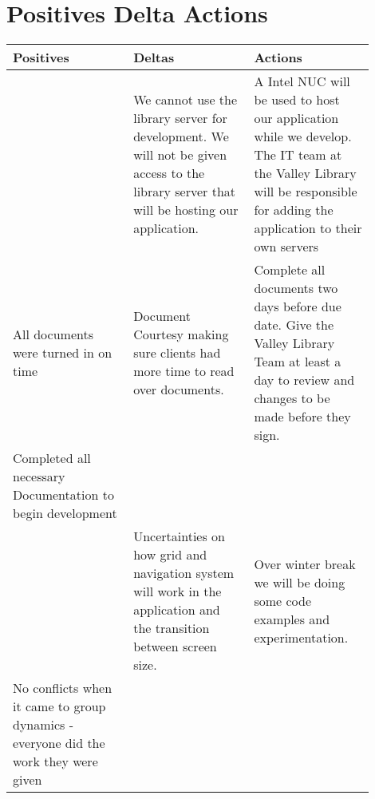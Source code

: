 \documentclass[letterpaper,10pt,titlepage, onecolumn, compsoc]{IEEEtran}
\begin{document}
\section{Positives \/Delta \/ Actions }
\begin{center}

\begin{tabular}{|p{0.3\linewidth}|p{0.3\linewidth}|p{0.3\linewidth}|}
\hline
\textbf{Positives}                                                                  & \textbf{Deltas}                                                                                                                           & \textbf{Actions}                                                                                                                                                         \\ \hline
                                                                                    & We cannot use the library server for development. We will not be given access to the library server that will be hosting our application. & A Intel NUC will be used to host our application while we develop. The IT team at the Valley Library will be responsible for adding the application to their own servers \\ \hline
All documents were turned in on time                                                & Document Courtesy making sure clients had more time to read over documents.                                                               & Complete all documents two days before due date. Give the Valley Library Team at least a day to review and changes to be made before they sign.                          \\ \hline
Completed all necessary Documentation to begin development                          &                                                                                                                                           &                                                                                                                                                                          \\ \hline
                                                                                    & Uncertainties on how grid and navigation system will work in the application and the transition between screen size.                      & Over winter break we will be doing some code examples and experimentation.                                                                                               \\ \hline
No conflicts when it came to group dynamics - everyone did the work they were given &                                                                                                                                           &                                                                                                                                                                          \\ \hline
\end{tabular}
\end{center}
\newpage
%
%
\end{document}
